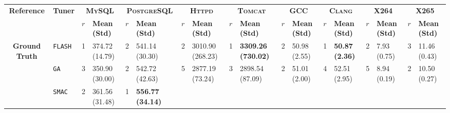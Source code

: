 \begin{tabular}{clllllllllllllllll}
\hline
\multicolumn{1}{c|}{\multirow{2}{*}{\textbf{Reference}}} &
  \multicolumn{1}{c|}{\multirow{2}{*}{\textbf{Tuner}}} &
  \multicolumn{2}{c|}{\textbf{\textsc{MySQL}}} &
  \multicolumn{2}{c|}{\textbf{\textsc{PostgreSQL}}} &
  \multicolumn{2}{c|}{\textbf{\textsc{Httpd}}} &
  \multicolumn{2}{c|}{\textbf{\textsc{Tomcat}}} &
  \multicolumn{2}{c|}{\textbf{\textsc{GCC}}} &
  \multicolumn{2}{c|}{\textbf{\textsc{Clang}}} &
  \multicolumn{2}{c|}{\textbf{\textsc{X264}}} &
  \multicolumn{2}{c}{\textbf{\textsc{X265}}} \\
\cline{3-18}
\multicolumn{1}{c|}{} &
  \multicolumn{1}{c|}{} &
  \textbf{$r$} &
  \multicolumn{1}{l|}{\textbf{Mean (Std)}} &
  \textbf{$r$} &
  \multicolumn{1}{l|}{\textbf{Mean (Std)}} &
  \textbf{$r$} &
  \multicolumn{1}{l|}{\textbf{Mean (Std)}} &
  \textbf{$r$} &
  \multicolumn{1}{l|}{\textbf{Mean (Std)}} &
  \textbf{$r$} &
  \multicolumn{1}{l|}{\textbf{Mean (Std)}} &
  \textbf{$r$} &
  \multicolumn{1}{l|}{\textbf{Mean (Std)}} &
  \textbf{$r$} &
  \multicolumn{1}{l|}{\textbf{Mean (Std)}} &
  \textbf{$r$} &
  \textbf{Mean (Std)} \\ \hline
\multicolumn{1}{c|}{\multirow{9}{*}{\textbf{Ground Truth}}} &
  \multicolumn{1}{l|}{\texttt{FLASH}} &
  \cellcolor{yellow!25}1 &
  \multicolumn{1}{l|}{\cellcolor{yellow!25}374.72 (14.79)} &
  2 &
  \multicolumn{1}{l|}{541.14 (30.30)} &
  2 &
  \multicolumn{1}{l|}{3010.90 (268.23)} &
  \cellcolor{yellow!25}1 &
  \multicolumn{1}{l|}{\cellcolor{yellow!25}\textbf{3309.26 (730.02)}} &
  2 &
  \multicolumn{1}{l|}{50.98 (2.55)} &
  \cellcolor{yellow!25}1 &
  \multicolumn{1}{l|}{\cellcolor{yellow!25}\textbf{50.87 (2.36)}} &
  2 &
  \multicolumn{1}{l|}{7.93 (0.75)} &
  3 &
  11.46 (0.43) \\
\multicolumn{1}{c|}{} &
  \multicolumn{1}{l|}{\texttt{GA}} &
  3 &
  \multicolumn{1}{l|}{350.90 (30.00)} &
  2 &
  \multicolumn{1}{l|}{542.72 (42.63)} &
  5 &
  \multicolumn{1}{l|}{2877.19 (73.24)} &
  3 &
  \multicolumn{1}{l|}{2898.54 (87.09)} &
  2 &
  \multicolumn{1}{l|}{51.01 (2.00)} &
  4 &
  \multicolumn{1}{l|}{52.51 (2.95)} &
  5 &
  \multicolumn{1}{l|}{8.94 (0.19)} &
  2 &
  10.50 (0.27) \\
\multicolumn{1}{c|}{} &
  \multicolumn{1}{l|}{\texttt{SMAC}} &
  2 &
  \multicolumn{1}{l|}{361.56 (31.48)} &
  \cellcolor{yellow!25}1 &
  \multicolumn{1}{l|}{\cellcolor{yellow!25}\textbf{556.77 (34.14)}} &

\end{tabular}
